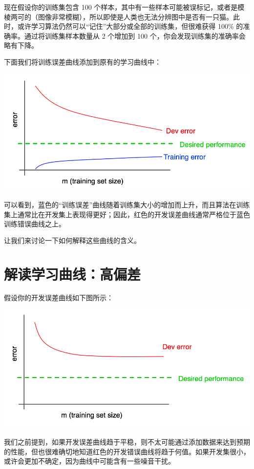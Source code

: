 现在假设你的训练集包含 100
个样本，其中有一些样本可能被误标记，或者是模棱两可的（图像非常模糊），所以即使是人类也无法分辨图中是否有一只猫。此时，或许学习算法仍然可以``记住''大部分或全部的训练集，但很难获得
100\% 的准确率。通过将训练集样本数量从 2 个增加到 100
个，你会发现训练集的准确率会略有下降。

下面我们将训练误差曲线添加到原有的学习曲线中：

\includegraphics{./img/ch29_01.jpg}

可以看到，蓝色的``训练误差''曲线随着训练集大小的增加而上升，而且算法在训练集上通常比在开发集上表现得更好；因此，红色的开发误差曲线通常严格位于蓝色训练错误曲线之上。

让我们来讨论一下如何解释这些曲线的含义。

\hypertarget{ux89e3ux8bfbux5b66ux4e60ux66f2ux7ebfux9ad8ux504fux5dee}{%
\chapter{解读学习曲线：高偏差}\label{ux89e3ux8bfbux5b66ux4e60ux66f2ux7ebfux9ad8ux504fux5dee}}

假设你的开发误差曲线如下图所示：

\includegraphics{./img/ch30_01.jpg}

我们之前提到，如果开发误差曲线趋于平稳，则不太可能通过添加数据来达到预期的性能，但也很难确切地知道红色的开发错误曲线将趋于何值。如果开发集很小，或许会更加不确定，因为曲线中可能含有一些噪音干扰。

